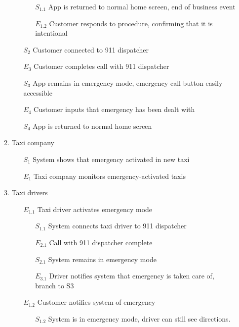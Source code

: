 \documentclass[]{article}
\begin{document}
\begin{enumerate}[{\textbf{BE}}1.]
\begin{enumerate}[{VP6}.1]
\begin{enumerate}
\begin{enumerate}
                    \item[$S_{1.1}$] App is returned to normal home screen, end of business event
                    \item[$E_{1.2}$] Customer responds to procedure, confirming that it is intentional
                \end{enumerate}
                \item[$S_2$] Customer connected to 911 dispatcher
                \item[$E_3$] Customer completes call with 911 dispatcher
                \item[$S_3$] App remains in emergency mode, emergency call button easily accessible
                \item[$E_4$] Customer inputs that emergency has been dealt with
                \item[$S_4$] App is returned to normal home screen
            \end{enumerate}
        \item Taxi company
            \begin{enumerate}
                \item[$S_1$] System shows that emergency activated in new taxi
                \item[$E_1$] Taxi company monitors emergency-activated taxis
            \end{enumerate}
        \item Taxi drivers
            \begin{enumerate}
                \item[$E_{1.1}$] Taxi driver activates emergency mode
                \begin{enumerate}
                    \item[$S_{1.1}$] System connects taxi driver to 911 dispatcher
                    \item[$E_{2.1}$] Call with 911 dispatcher complete
                    \item[$S_{2.1}$] System remains in emergency mode
                    \item[$E_{3.1}$] Driver notifies system that emergency is taken care of, branch to S3
                \end{enumerate}
                \item[$E_{1.2}$] Customer notifies system of emergency
                \begin{enumerate}
                    \item[$S_{1.2}$] System is in emergency mode, driver can still see directions.

\end{enumerate}
\end{enumerate}
\end{enumerate}
\end{enumerate}
\end{document}
